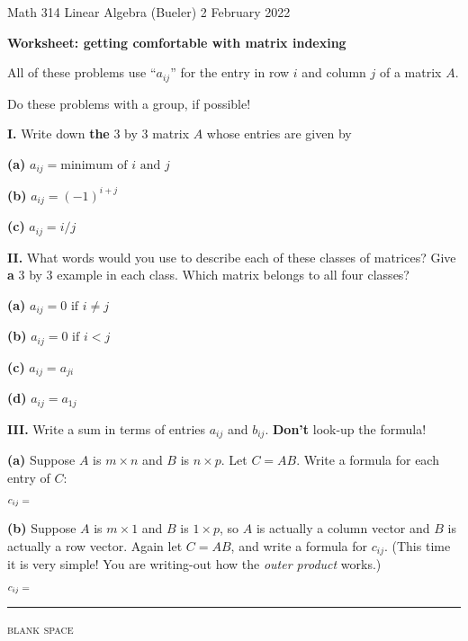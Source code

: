 \documentclass[12pt]{amsart}
\newcommand{\prob}[1]{\bigskip\noindent\textbf{#1.}\quad }
\newcommand{\epart}[1]{\bigskip\noindent\textbf{(#1)}\quad }
\begin{document}
\scriptsize \noindent Math 314 Linear Algebra (Bueler) \hfill 2 February 2022 
\normalsize\medskip

\Large\centerline{\textbf{Worksheet: getting comfortable with matrix indexing}}
\medskip
\normalsize

\thispagestyle{empty}
\begin{center}
All of these problems use ``$a_{ij}$'' for the entry in row $i$ and column $j$ of a matrix $A$. 

Do these problems with a group, if possible!
\end{center}

\prob{I}  Write down \textbf{the} 3 by 3 matrix $A$ whose entries are given by

\epart{a} $a_{ij} = \text{minimum of } i \text{ and } j$
\vfill

\epart{b} $a_{ij} = (-1)^{i+j}$
\vfill

\epart{c} $a_{ij} = i/j$
\vfill

\prob{II}  What words would you use to describe each of these classes of matrices?  Give \textbf{a} 3 by 3 example in each class.  Which matrix belongs to all four classes?

\epart{a} $a_{ij} = 0 \text{ if } i \ne j$
\vfill

\epart{b} $a_{ij} = 0 \text{ if } i < j$
\vfill

\epart{c} $a_{ij} = a_{ji}$
\vfill

\epart{d} $a_{ij} = a_{1j}$
\vfill

\clearpage \newpage
\prob{III}  Write a sum in terms of entries $a_{ij}$ and $b_{ij}$.  \textbf{Don't} look-up the formula!

\epart{a} Suppose $A$ is $m \times n$ and $B$ is $n \times p$.  Let $C=AB$.  Write a formula for each entry of $C$:

$$c_{ij} = \hspace{6.0in}$$
\vfill

\epart{b} Suppose $A$ is $m \times 1$ and $B$ is $1 \times p$, so $A$ is actually a column vector and $B$ is actually a row vector.  Again let $C=AB$, and write a formula for $c_{ij}$.  (This time it is very simple!  You are writing-out how the \emph{outer product} works.)

$$c_{ij} = \hspace{6.0in}$$
\vspace{1.0in}

\noindent \hrule
\bigskip
\centerline{\footnotesize \textsc{blank space}}
\vspace{4.0in}
\end{document}
